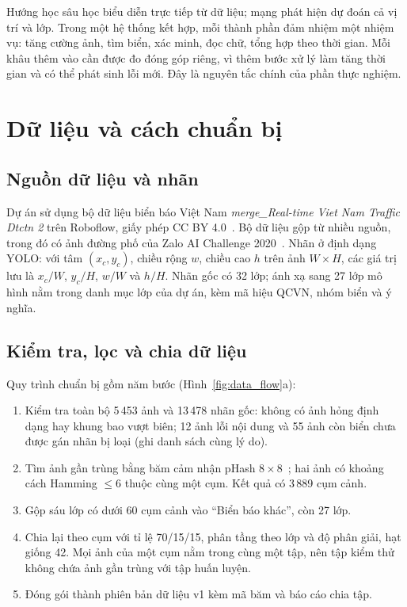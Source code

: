 Hướng học sâu học biểu diễn trực tiếp từ dữ liệu; mạng phát hiện dự đoán cả vị trí và lớp. Trong một hệ thống kết hợp, mỗi thành phần đảm nhiệm một nhiệm vụ: tăng cường ảnh, tìm biển, xác minh, đọc chữ, tổng hợp theo thời gian. Mỗi khâu thêm vào cần được đo đóng góp riêng, vì thêm bước xử lý làm tăng thời gian và có thể phát sinh lỗi mới. Đây là nguyên tắc chính của phần thực nghiệm.

\section{Dữ liệu và cách chuẩn bị}
\label{sec:data}

\subsection{Nguồn dữ liệu và nhãn}
Dự án sử dụng bộ dữ liệu biển báo Việt Nam \textit{merge\_Real-time Viet Nam Traffic Dtctn 2} trên Roboflow, giấy phép CC BY 4.0~\cite{roboflow_dataset,utci_data}. Bộ dữ liệu gộp từ nhiều nguồn, trong đó có ảnh đường phố của Zalo AI Challenge 2020~\cite{zalo2020tsd}. Nhãn ở định dạng YOLO: với tâm $(x_c,y_c)$, chiều rộng $w$, chiều cao $h$ trên ảnh $W\times H$, các giá trị lưu là $x_c/W$, $y_c/H$, $w/W$ và $h/H$. Nhãn gốc có 32 lớp; ánh xạ sang 27 lớp mô hình nằm trong danh mục lớp của dự án, kèm mã hiệu QCVN, nhóm biển và ý nghĩa.

\subsection{Kiểm tra, lọc và chia dữ liệu}
Quy trình chuẩn bị gồm năm bước (Hình~\ref{fig:data_flow}a):
\begin{enumerate}
 \item Kiểm tra toàn bộ 5\,453 ảnh và 13\,478 nhãn gốc: không có ảnh hỏng định dạng hay khung bao vượt biên; 12 ảnh lỗi nội dung và 55 ảnh còn biển chưa được gán nhãn bị loại (ghi danh sách cùng lý do).
 \item Tìm ảnh gần trùng bằng băm cảm nhận pHash $8\times8$~\cite{imagehash_phash}; hai ảnh có khoảng cách Hamming $\le6$ thuộc cùng một cụm. Kết quả có 3\,889 cụm cảnh.
 \item Gộp sáu lớp có dưới 60 cụm cảnh vào ``Biển báo khác'', còn 27 lớp.
 \item Chia lại theo cụm với tỉ lệ 70/15/15, phân tầng theo lớp và độ phân giải, hạt giống 42. Mọi ảnh của một cụm nằm trong cùng một tập, nên tập kiểm thử không chứa ảnh gần trùng với tập huấn luyện.
 \item Đóng gói thành phiên bản dữ liệu v1 kèm mã băm và báo cáo chia tập.
\end{enumerate}

